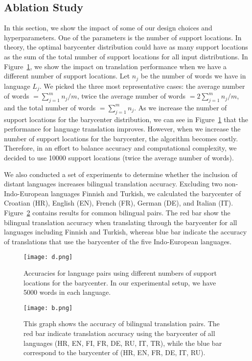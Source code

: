 \documentclass{article}
\begin{document}
\subsection{Ablation Study} In this section, we show the impact of some of our design choices and hyperparameters.
One of the parameters is the number of support locations. In theory, the optimal barycenter distribution could have as many support locations as the sum of the total number of support locations for all input distributions.
In Figure~\ref{fig:number-of-support}, we show the impact on translation performance when we have a different number of support locations. Let $n_j$ be the number of words we have in language $L_j$.
We picked the three most representative cases: the average number of words $ = \sum_{j=1}^m n_j / m$, twice the average number of words $ = 2\sum_{j=1}^m n_j / m$, and the total number of words $= \sum_{j=1}^m n_j$.
As we increase the number of support locations for the barycenter distribution, we can see in Figure~\ref{fig:number-of-support} that the performance for language translation improves. However, when we increase the number of support locations for the barycenter, the algorithm becomes costly.
Therefore, in an effort to balance accuracy and computational complexity, we decided to use 10000 support locations (twice the average number of words). 

We also conducted a set of experiments to determine whether the inclusion of distant languages increases bilingual translation accuracy. Excluding two non-Indo-European languages Finnish and Turkish, we calculated the barycenter of 
Croatian (HR), English (EN), French (FR), German (DE), and Italian (IT).
Figure~\ref{fig:compare} contains results for common bilingual pairs. The red bar show the bilingual translation accuracy when translating through the barycenter for all languages including Finnish and Turkish, whereas blue bar indicate the accuracy of translations that use the barycenter of the five Indo-European languages. 


\begin{figure}[ht]
    \centering
    \texttt{[image: d.png]}
    \caption{Accuracies for language pairs using different numbers of support locations for the barycenter. In our experimental setup, we have 5000 words in each language.
    }
\label{fig:number-of-support}
\end{figure}

\begin{figure}
    \centering
    \texttt{[image: b.png]}
    \caption{This graph shows the accuracy of bilingual translation pairs. The red bar indicate translation accuracy using the barycenter of all languages (HR, EN, FI, FR, DE, RU, IT, TR), while the blue bar correspond to the barycenter of (HR, EN, FR, DE, IT, RU).}
    \label{fig:compare}
\end{figure}
\end{document}

